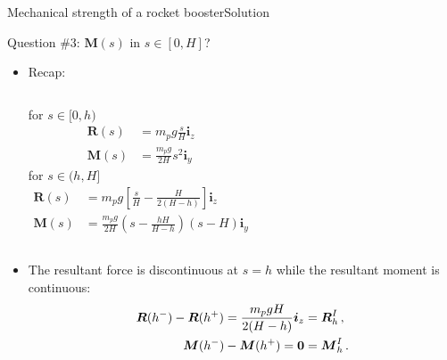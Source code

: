 \documentclass{beamer}
\newcommand{\yj}{y}
\newcommand{\zj}{z}
\renewcommand{\ij}{i}
\newcommand{\iv}{{\boldsymbol\ij}}
\newcommand{\Rj}{R}
\newcommand{\Rv}{{\boldsymbol\Rj}}
\newcommand{\Fresj}{R}
\newcommand{\Mresj}{M}
\newcommand{\Fres}{{\boldsymbol\Fresj}}
\newcommand{\Mres}{{\boldsymbol\Mresj}}
\newcommand{\bzero}{{\bf 0}}
\begin{document}
\begin{frame}{Mechanical strength of a rocket booster}{Solution}
\begin{overprint}
\vskip-20pt
\begin{exampleblock}{Question \#3: $\Mres(s)$ in $s\in[0,H]$?}
\begin{itemize}
\item Recap:
\begin{columns}[t]
\centering for $s\in[0,h)$
\begin{displaymath}
\begin{split}
\Fres(s) &= \scriptstyle m_p g\frac{s}{H}\iv_\zj \\
\Mres(s) &=\scriptstyle \frac{m_p g}{2H}s^2\iv_\yj
\end{split}
\end{displaymath}
\centering for $s\in(h,H]$
\begin{displaymath}
\begin{split}
\Fres(s) &=\scriptstyle m_p g\left[\frac{s}{H}-\frac{H}{2(H-h)}\right]\iv_\zj\\
\Mres(s) &=\scriptstyle \frac{m_p g}{2H}\left(s-\frac{hH}{H-h}\right)(s-H)\iv_\yj
\end{split}
\end{displaymath}
\end{columns}
\vskip10pt
\item The resultant force is discontinuous at $s=h$ while the resultant moment is continuous: 
\begin{displaymath}
\begin{split}
\Fres(h^-)-\Fres(h^+)=\frac{m_p g H}{2(H-h)}\iv_\zj &=\Rv_h^I\,, \\
\Mres(h^-)-\Mres(h^+)=\bzero &=\Mres_h^I\,.
\end{split}
\end{displaymath}
\end{itemize}
\end{exampleblock}

\end{overprint}

\end{frame}
\end{document}
